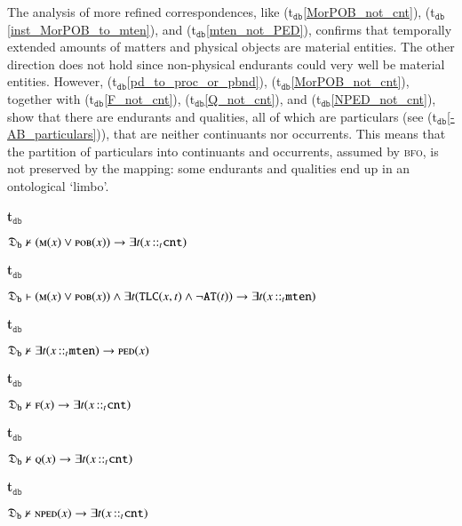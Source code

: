 \documentclass[ao]{iosart2x}
\newcommand{\bflist}{\begin{list}{}{\setlength{\topsep}{2mm}\setlength{\parsep}{0mm}\setlength{\leftmargin}{9.2mm}\setlength{\labelwidth}{8mm}}}
\newcommand{\eflist}{\end{list}}
\newcommand{\dbThrLabel}{\textrm{t$_\texttt{db}$}}
\newcounter{cntdbth}
\newcommand{\dbth}[1]{\refstepcounter{cntdbth}\begin{small}{\bf \dbThrLabel\thecntdbth\label{#1}}\end{small}}
\newcommand{\refdbth}[1]{({\dbThrLabel}\ref{#1})}
\newcommand{\pr}[1]{\mathtt{#1}}
\newcommand{\cn}[1]{\mathtt{#1}}
\newcommand{\bfo}{{\textsc{bfo}}}
\newcommand {\thdolcedbmap} {\ensuremath{\mathfrak{D}_\texttt{b}}}
\newcommand {\Mdcat} {\textsc{m}}
\newcommand {\Fdcat} {\textsc{f}}
\newcommand {\NPEDdcat} {\textsc{nped}}
\newcommand {\PEDdcat} {\textsc{ped}}
\newcommand {\POBdcat} {\textsc{pob}}
\newcommand {\Qdcat} {\textsc{q}}
\newcommand {\ATd} {\ensuremath{\pr{AT}}}
\newcommand {\TLCd} {\ensuremath{\pr{TLC}}}
\newcommand{\cntbcat}{\cn{cnt}}
\newcommand{\mtenbcat}{\cn{mten}}
\newcommand{\bfoiof}[1]{{\,::_{#1\:\!}}}
\begin{document}
The analysis of more refined correspondences, like \refdbth{MorPOB_not_cnt}, \refdbth{inst_MorPOB_to_mten}, and \refdbth{mten_not_PED}, confirms that temporally extended amounts of matters and physical objects are material entities. The other direction does not hold since non-physical endurants could very well be material entities. However,  \refdbth{pd_to_proc_or_pbnd}, \refdbth{MorPOB_not_cnt}, together with \refdbth{F_not_cnt}, \refdbth{Q_not_cnt}, and \refdbth{NPED_not_cnt}, show that there are endurants and qualities, all of which are particulars (see \refdbth{-AB_particulars}), that are neither continuants nor occurrents. This means that the partition of particulars into continuants and occurrents, assumed by {\bfo}, is not preserved by the mapping: some endurants and qualities end up in an ontological `limbo'. 
%
\bflist
\item[\dbth{MorPOB_not_cnt}] $\thdolcedbmap \nvdash (\Mdcat(x) \lor \POBdcat(x)) \to \exists t(x \bfoiof{t} \cntbcat)$

\item[\dbth{inst_MorPOB_to_mten}] $\thdolcedbmap \vdash (\Mdcat(x) \lor \POBdcat(x)) \land \exists t(\TLCd(x,t) \land \neg \ATd(t)) \to \exists t(x \bfoiof{t} \mtenbcat)$

\item[\dbth{mten_not_PED}] $\thdolcedbmap \nvdash \exists t(x \bfoiof{t} \mtenbcat) \to \PEDdcat(x)$

\item[\dbth{F_not_cnt}] $\thdolcedbmap \nvdash \Fdcat(x) \to \exists t(x \bfoiof{t} \cntbcat)$

\item[\dbth{Q_not_cnt}] $\thdolcedbmap \nvdash \Qdcat(x) \to \exists t(x \bfoiof{t} \cntbcat)$

\item[\dbth{NPED_not_cnt}] $\thdolcedbmap \nvdash \NPEDdcat(x) \to \exists t(x \bfoiof{t} \cntbcat)$
\eflist
\end{document}
